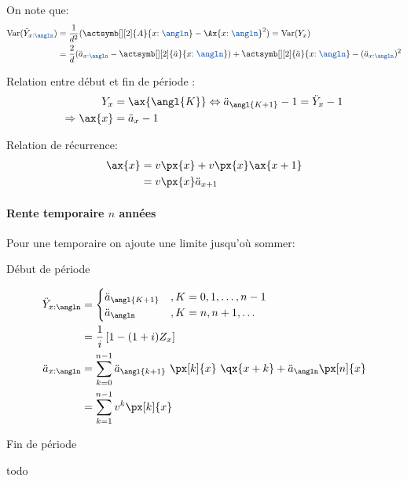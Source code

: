 \documentclass[10pt, french]{article}
\begin{document}
\begin{multicols*}{3}
On note que:
\begin{align*}
	\text{Var}(\ddot{Y}_{x\textcolor{cobalt}{:\angln}})
	&=	\frac{1}{d^{2}}(\actsymb[][2]{A}{x\textcolor{cobalt}{:\angln}} - \Ax{x\textcolor{cobalt}{:\angln}}^{2})
	=	\text{Var}(Y_{x})	\\
	&=	\frac{2}{d}(\ddot{a}_{x\textcolor{cobalt}{:\angln}} - \actsymb[][2]{\ddot{a}}{x\textcolor{cobalt}{:\angln}}) + \actsymb[][2]{\ddot{a}}{x\textcolor{cobalt}{:\angln}} - (\ddot{a}_{x\textcolor{cobalt}{:\angln}})^{2}
\end{align*}

Relation entre début et fin de période :
\begin{align*}
	Y_{x}	
	&=	\ax{\angl{K}}	
	\Leftrightarrow	\ddot{a}_{\angl{K + 1}} - 1 
	=	\ddot{Y}_{x} - 1 	\\
	\Rightarrow \ax{x} 
	&= \ddot{a}_{x} - 1
\end{align*}

Relation de récurrence:
\begin{align*}
	\ax{x} 
	&= v \px{x}	+	v \px{x}	 \ax{x + 1}	\\
	&= v \px{x}\ddot{a}_{x + 1}	
\end{align*}

\paragraph{Rente temporaire $n$ années}

Pour une temporaire on ajoute une limite jusqu'où sommer:\\

\begin{minipage}[t]{0.5\columnwidth}
\begin{center}
Début de période
\end{center}
\begin{align*}
\ddot{Y}_{x:\angln} 
	&= 	\begin{cases}
			\ddot{a}_{\angl{K + 1}}	& , K = 0, 1, \dots, n - 1 \\
			\ddot{a}_{\angln}		& , K = n, n + 1, \dots \\
		\end{cases} \\
	&=	\frac{1}{i} \left[ 1 - (1 + i) Z_{x} \right]	\\
	\ddot{a}_{x:\angln}	
	&=	\sum_{k = 0}^{n - 1} \ddot{a}_{\angl{k + 1}} \ \px[k]{x} \ \qx{x + k}	+	\ddot{a}_{\angln} \px[n]{x}	\\
	&=	\sum_{k = 1}^{n - 1} v^{k} \px[k]{x}
\end{align*}
\end{minipage}
\begin{minipage}[t]{0.5\columnwidth}
\begin{center}
Fin de période
\end{center}
todo
\end{minipage}



\end{multicols*}
\end{document}
